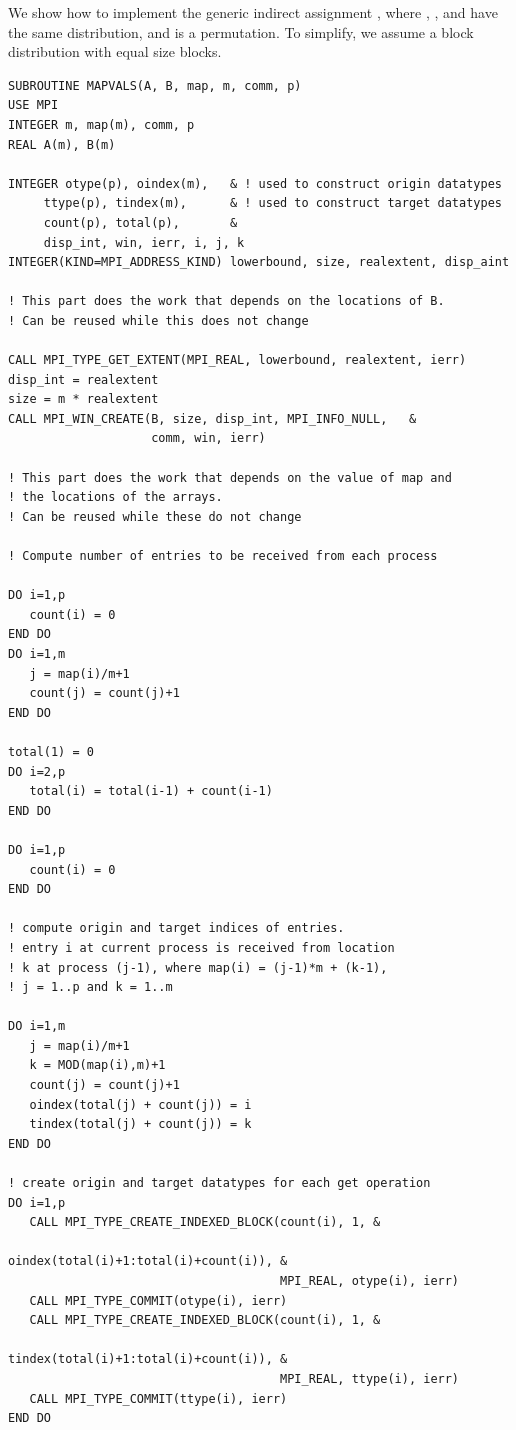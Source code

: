 \begin{example}
\label{ex:1sided-goodmap}
%
We show how to implement the generic indirect assignment
, where ,
, and 
 have the same
distribution, and  is a permutation.  To simplify, we assume
a block distribution with equal size 
blocks.

\begin{lstlisting}[language={[MPI]Fortran},basicstyle=\lstsmall]
SUBROUTINE MAPVALS(A, B, map, m, comm, p)
USE MPI
INTEGER m, map(m), comm, p
REAL A(m), B(m)

INTEGER otype(p), oindex(m),   & ! used to construct origin datatypes
     ttype(p), tindex(m),      & ! used to construct target datatypes
     count(p), total(p),       &
     disp_int, win, ierr, i, j, k
INTEGER(KIND=MPI_ADDRESS_KIND) lowerbound, size, realextent, disp_aint

! This part does the work that depends on the locations of B.
! Can be reused while this does not change

CALL MPI_TYPE_GET_EXTENT(MPI_REAL, lowerbound, realextent, ierr)
disp_int = realextent
size = m * realextent
CALL MPI_WIN_CREATE(B, size, disp_int, MPI_INFO_NULL,   &
                    comm, win, ierr)

! This part does the work that depends on the value of map and
! the locations of the arrays.
! Can be reused while these do not change

! Compute number of entries to be received from each process

DO i=1,p
   count(i) = 0
END DO
DO i=1,m
   j = map(i)/m+1
   count(j) = count(j)+1
END DO

total(1) = 0
DO i=2,p
   total(i) = total(i-1) + count(i-1)
END DO

DO i=1,p
   count(i) = 0
END DO

! compute origin and target indices of entries.
! entry i at current process is received from location
! k at process (j-1), where map(i) = (j-1)*m + (k-1),
! j = 1..p and k = 1..m

DO i=1,m
   j = map(i)/m+1
   k = MOD(map(i),m)+1
   count(j) = count(j)+1
   oindex(total(j) + count(j)) = i
   tindex(total(j) + count(j)) = k
END DO

! create origin and target datatypes for each get operation
DO i=1,p
   CALL MPI_TYPE_CREATE_INDEXED_BLOCK(count(i), 1, &
                                      oindex(total(i)+1:total(i)+count(i)), &
                                      MPI_REAL, otype(i), ierr)
   CALL MPI_TYPE_COMMIT(otype(i), ierr)
   CALL MPI_TYPE_CREATE_INDEXED_BLOCK(count(i), 1, &
                                      tindex(total(i)+1:total(i)+count(i)), &
                                      MPI_REAL, ttype(i), ierr)
   CALL MPI_TYPE_COMMIT(ttype(i), ierr)
END DO


\end{lstlisting}
\end{example}
